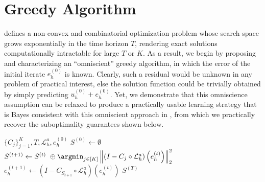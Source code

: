 \documentclass{article} %
\begin{document}


\section{Greedy Algorithm} \label{sec:greedy}

 defines a non-convex and combinatorial optimization problem whose search space grows exponentially in the time horizon $T$, rendering exact solutions computationally intractable for large $T$ or $K$. As a result, we begin by proposing and characterizing an ``omniscient'' greedy algorithm, in which the error of the initial iterate $e^{(0)}_h$ is known. Clearly, such a residual would be unknown in any problem of practical interest, else the solution function could be trivially obtained by simply predicting $u^{(0)}_h + e^{(0)}_h$. Yet, we demonstrate that this omniscience assumption can be relaxed to produce a practically usable learning strategy that is Bayes consistent with this omniscient approach in , from which we practically recover the suboptimality guarantees shown below.




\begin{algorithm} 
\caption{Greedy Algorithm for a Hybrid PDE solver}\label{alg:greedy}
\begin{algorithmic}
\Require $\{C_{j}\}_{j = 1}^{K}, T, \mathcal{L}_h^a, e^{(0)}_h$
\State $S^{(0)} \gets \emptyset$
    \State $S^{(t + 1)} \gets S^{(t)} \ \oplus \argmin_{j \in [K]}\left\|\left( I - C_{j} \circ \mathcal{L}_{h}^a\right)\left(e^{(t)}_h\right)\right\|^2_2$
    \State $e^{(t + 1)}_h \gets \left(I - C_{S_{t+ 1}} \circ \mathcal{L}_{h}^a\right) \left(e^{(t)}_h\right)$
\EndFor
\State \Return $S^{(T)}$
\end{algorithmic}

\end{algorithm}

\end{document}
